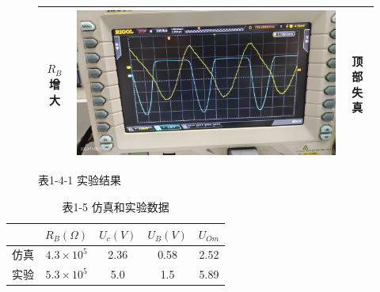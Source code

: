 \documentclass[a4paper,10pt,notitlepage]{article}
\begin{document}
\begin{enumerate}
\begin{figure}[h]
\begin{minipage}{0.19\textwidth}
\begin{tabular}{|c|c|c|}
						\hline
						$R_B$增大 & \includegraphics[width=\textwidth]{1-15.jpg} & 顶部失真 \\
						\hline
					\end{tabular}
					\caption*{表1-4-1 实验结果}
				\end{minipage}
			\end{figure}
			\newpage
			\begin{table}[h]
				\centering
				\begin{tabular}{|c|c|c|c|c|}
					\hline
					& $R_B(\Omega)$ & $U_c(V)$ & $U_B(V)$ & $U_{Om}$ \\
					\hline
					仿真 & $4.3 \times 10^5$ & 2.36 & 0.58 & 2.52 \\
					\hline
					实验 & $5.3 \times 10^5$ & 5.0 & 1.5 & 5.89 \\
					\hline
				\end{tabular}
				\caption*{表1-5 仿真和实验数据}
			\end{table}
		\end{enumerate}
\end{document}
